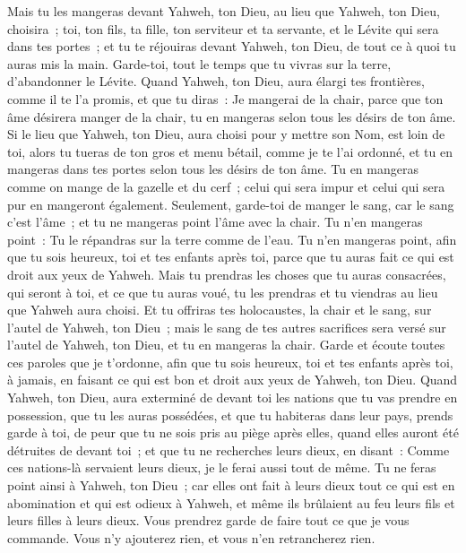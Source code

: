\begin{multicols}{2}
Mais tu les mangeras devant Yahweh, ton Dieu, au lieu que Yahweh, ton Dieu, choisira~; toi, ton fils, ta fille, ton serviteur et ta servante, et le Lévite qui sera dans tes portes~; et tu te réjouiras devant Yahweh, ton Dieu, de tout ce à quoi tu auras mis la main.
Garde-toi, tout le temps que tu vivras sur la terre, d'abandonner le Lévite.
Quand Yahweh, ton Dieu, aura élargi tes frontières, comme il te l'a promis, et que tu diras~: Je mangerai de la chair, parce que ton âme désirera manger de la chair, tu en mangeras selon tous les désirs de ton âme.
Si le lieu que Yahweh, ton Dieu, aura choisi pour y mettre son Nom, est loin de toi, alors tu tueras de ton gros et menu bétail, comme je te l'ai ordonné, et tu en mangeras dans tes portes selon tous les désirs de ton âme.
Tu en mangeras comme on mange de la gazelle et du cerf~; celui qui sera impur et celui qui sera pur en mangeront également.
Seulement, garde-toi de manger le sang, car le sang c'est l'âme~; et tu ne mangeras point l'âme avec la chair.
Tu n'en mangeras point~: Tu le répandras sur la terre comme de l'eau.
Tu n'en mangeras point, afin que tu sois heureux, toi et tes enfants après toi, parce que tu auras fait ce qui est droit aux yeux de Yahweh.
Mais tu prendras les choses que tu auras consacrées, qui seront à toi, et ce que tu auras voué, tu les prendras et tu viendras au lieu que Yahweh aura choisi.
Et tu offriras tes holocaustes, la chair et le sang, sur l'autel de Yahweh, ton Dieu~; mais le sang de tes autres sacrifices sera versé sur l'autel de Yahweh, ton Dieu, et tu en mangeras la chair.
Garde et écoute toutes ces paroles que je t'ordonne, afin que tu sois heureux, toi et tes enfants après toi, à jamais, en faisant ce qui est bon et droit aux yeux de Yahweh, ton Dieu.
Quand Yahweh, ton Dieu, aura exterminé de devant toi les nations que tu vas prendre en possession, que tu les auras possédées, et que tu habiteras dans leur pays,
 prends garde à toi, de peur que tu ne sois pris au piège après elles, quand elles auront été détruites de devant toi~; et que tu ne recherches leurs dieux, en disant~: Comme ces nations-là servaient leurs dieux, je le ferai aussi tout de même.
Tu ne feras point ainsi à Yahweh, ton Dieu~; car elles ont fait à leurs dieux tout ce qui est en abomination et qui est odieux à Yahweh, et même ils brûlaient au feu leurs fils et leurs filles à leurs dieux.
Vous prendrez garde de faire tout ce que je vous commande. Vous n'y ajouterez rien, et vous n'en retrancherez rien.

\end{multicols}
